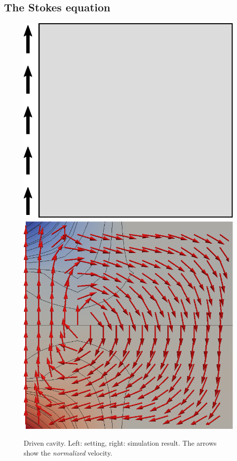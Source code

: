 \documentclass[a4paper,10pt,headings=normal,bibliography=totoc]{scrartcl}
\begin{document}
\subsection{The Stokes equation}

\begin{figure}
 \begin{center}
  \includegraphics[height=0.3\textheight]{driven_cavity}
  \qquad
  \includegraphics[height=0.3\textheight]{driven_cavity_result}
 \end{center}
 \caption{Driven cavity. Left: setting, right: simulation result.  The arrows show the {\em normalized} velocity.}
 \label{fig:driven_cavity}
\end{figure}
\end{document}
